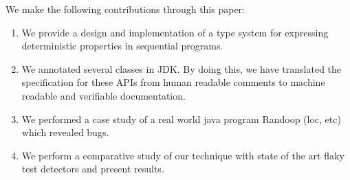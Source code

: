 We make the following contributions through this paper:
\begin{enumerate}
	\item We provide a design and implementation of a type system for expressing deterministic properties in sequential programs.
	\item We annotated several classes in JDK. By doing this, we have translated the specification for these APIs from
	human readable comments to machine readable and verifiable documentation.
	\item We performed a case study of a real world java program Randoop (loc, etc) which revealed bugs.
	\item We perform a comparative study of our technique with state of the art flaky test detectors and present results.
\end{enumerate}


